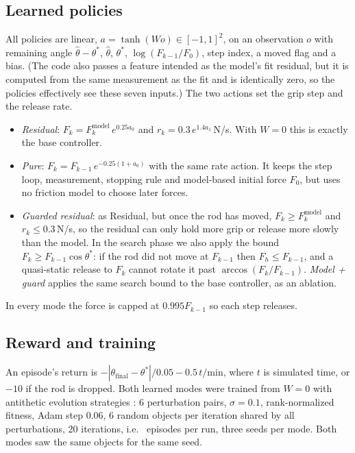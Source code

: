 \documentclass[11pt]{article}
\begin{document}
\subsection{Learned policies}
All policies are linear, $a=\tanh(W o)\in[-1,1]^2$, on an observation $o$ with remaining angle $\hat\theta-\theta^*$, $\hat\theta$, $\theta^*$, $\log(F_{k-1}/F_0)$, step index, a moved flag and a bias. (The code also passes a feature intended as the model's fit residual, but it is computed from the same measurement as the fit and is identically zero, so the policies effectively see these seven inputs.) The two actions set the grip step and the release rate.
\begin{itemize}
\item \emph{Residual}: $F_k=F^{\text{model}}_k\,e^{0.25a_0}$ and $r_k=0.3\,e^{1.4a_1}$\,N/s. With $W=0$ this is exactly the base controller.
\item \emph{Pure}: $F_k=F_{k-1}\,e^{-0.25(1+a_0)}$ with the same rate action. It keeps the step loop, measurement, stopping rule and model-based initial force $F_0$, but uses no friction model to choose later forces.
\item \emph{Guarded residual}: as Residual, but once the rod has moved, $F_k\ge F^{\text{model}}_k$ and $r_k\le 0.3$\,N/s, so the residual can only hold more grip or release more slowly than the model. In the search phase we also apply the bound $F_k\ge F_{k-1}\cos\theta^*$: if the rod did not move at $F_{k-1}$ then $F_h\le F_{k-1}$, and a quasi-static release to $F_k$ cannot rotate it past $\arccos(F_k/F_{k-1})$. \emph{Model + guard} applies the same search bound to the base controller, as an ablation.
\end{itemize}
In every mode the force is capped at $0.995F_{k-1}$ so each step releases.

\subsection{Reward and training}
An episode's return is $-|\theta_{\text{final}}-\theta^*|/0.05 - 0.5\,t/\text{min}$, where $t$ is simulated time, or $-10$ if the rod is dropped. Both learned modes were trained from $W=0$ with antithetic evolution strategies \cite{salimans2017}: 6 perturbation pairs, $\sigma=0.1$, rank-normalized fitness, Adam step 0.06, 6 random objects per iteration shared by all perturbations, 20 iterations, i.e.\ \EpPerRun{} episodes per run, three seeds per mode. Both modes saw the same objects for the same seed.
\end{document}
